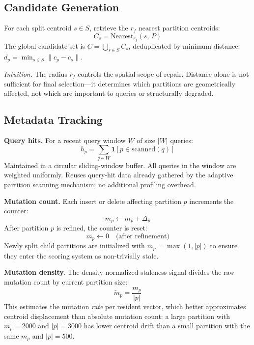 \documentclass[sigconf, nonacm]{acmart}
\begin{document}
\subsection{Candidate Generation}

For each split centroid $s \in S$, retrieve the $r_f$ nearest
partition centroids:
\begin{equation}
  C_s = \mathrm{Nearest}_{r_f}(s,\, P)
\end{equation}
The global candidate set is $C = \bigcup_{s \in S} C_s$, deduplicated
by minimum distance: $d_p = \min_{s \in S} \|c_p - c_s\|$.

\textit{Intuition.} The radius $r_f$ controls the spatial scope of
repair. Distance alone is not sufficient for final selection---it
determines which partitions are geometrically affected, not which
are important to queries or structurally degraded.

\subsection{Metadata Tracking}

\textbf{Query hits.}
For a recent query window $W$ of size $|W|$ queries:
\begin{equation}
  h_p = \sum_{q \in W} \mathbf{1}[p \in \mathrm{scanned}(q)]
\end{equation}
Maintained in a circular sliding-window buffer. All queries in the
window are weighted uniformly. Reuses query-hit data already gathered
by the adaptive partition scanning mechanism; no additional profiling
overhead.

\textbf{Mutation count.}
Each insert or delete affecting partition $p$ increments the counter:
\begin{equation}
  m_p \leftarrow m_p + \Delta_p
\end{equation}
After partition $p$ is refined, the counter is reset:
\begin{equation}
  m_p \leftarrow 0 \quad \text{(after refinement)}
\end{equation}
Newly split child partitions are initialized with
$m_p = \max(1, |p|)$ to ensure they enter the scoring system as
non-trivially stale.

\textbf{Mutation density.}
The density-normalized staleness signal divides the raw mutation count
by current partition size:
\begin{equation}
  \tilde{m}_p = \frac{m_p}{|p|}
  \label{eq:density}
\end{equation}
This estimates the mutation \emph{rate} per resident vector, which
better approximates centroid displacement than absolute mutation count:
a large partition with $m_p = 2000$ and $|p| = 3000$ has lower
centroid drift than a small partition with the same $m_p$ and $|p| = 500$.
\end{document}
